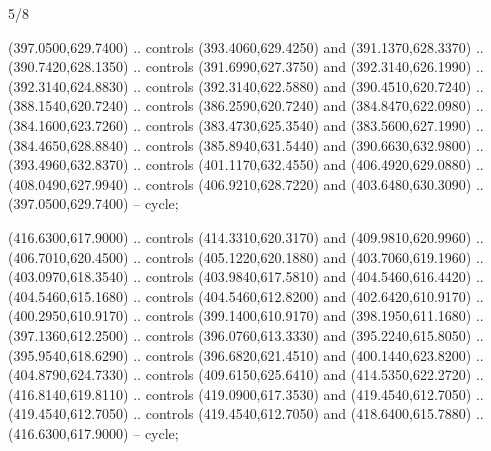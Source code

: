 \begin{flagdescription}{5/8}
\begin{scope}[shift={(m)}]
\begin{scope}[scale=\flagwidth/220,y=0.1mm, x=0.1mm, yscale=-1,shift={(-596,-360)}]
\begin{scope}[draw=black,line join=round,line cap=round,line width=0.381\lw]
\begin{scope}[line width=0.534\lw,fill=green]
 (397.0500,629.7400) .. controls (393.4060,629.4250) and
  (391.1370,628.3370) .. (390.7420,628.1350) .. controls (391.6990,627.3750) and
  (392.3140,626.1990) .. (392.3140,624.8830) .. controls (392.3140,622.5880) and
  (390.4510,620.7240) .. (388.1540,620.7240) .. controls (386.2590,620.7240) and
  (384.8470,622.0980) .. (384.1600,623.7260) .. controls (383.4730,625.3540) and
  (383.5600,627.1990) .. (384.4650,628.8840) .. controls (385.8940,631.5440) and
  (390.6630,632.9800) .. (393.4960,632.8370) .. controls (401.1170,632.4550) and
  (406.4920,629.0880) .. (408.0490,627.9940) .. controls (406.9210,628.7220) and
  (403.6480,630.3090) .. (397.0500,629.7400) -- cycle;

 (416.6300,617.9000) .. controls (414.3310,620.3170) and
  (409.9810,620.9960) .. (406.7010,620.4500) .. controls (405.1220,620.1880) and
  (403.7060,619.1960) .. (403.0970,618.3540) .. controls (403.9840,617.5810) and
  (404.5460,616.4420) .. (404.5460,615.1680) .. controls (404.5460,612.8200) and
  (402.6420,610.9170) .. (400.2950,610.9170) .. controls (399.1400,610.9170) and
  (398.1950,611.1680) .. (397.1360,612.2500) .. controls (396.0760,613.3330) and
  (395.2240,615.8050) .. (395.9540,618.6290) .. controls (396.6820,621.4510) and
  (400.1440,623.8200) .. (404.8790,624.7330) .. controls (409.6150,625.6410) and
  (414.5350,622.2720) .. (416.8140,619.8110) .. controls (419.0900,617.3530) and
  (419.4540,612.7050) .. (419.4540,612.7050) .. controls (419.4540,612.7050) and
  (418.6400,615.7880) .. (416.6300,617.9000) -- cycle;


\end{scope}
\end{scope}
\end{scope}
\end{scope}
\end{flagdescription}
